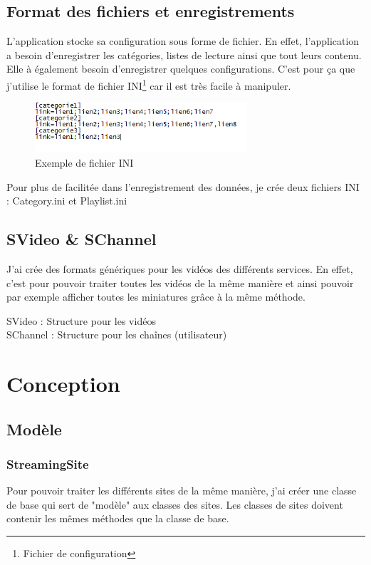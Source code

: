 \documentclass[11pt]{report} %
\begin{document}
		\subsection{Format des fichiers et enregistrements}
		L'application stocke sa configuration sous forme de fichier. En effet, l'application a besoin d'enregistrer les catégories, listes de lecture ainsi que tout leurs contenu. Elle à également besoin d'enregistrer quelques configurations. C'est pour ça que j'utilise le format de fichier INI\footnote{Fichier de configuration} car il est très facile à manipuler. 
		
		\begin{figure}[h]
			\center
			\includegraphics[width=0.7\textwidth]{../img/inifile.png}
			\caption{Exemple de fichier INI}
			\label{inifile}
		\end{figure}
		
		Pour plus de facilitée dans l'enregistrement des données, je crée deux fichiers INI : Category.ini et Playlist.ini
			
		\subsection{SVideo \& SChannel}
			J'ai crée des formats génériques pour les vidéos des différents services. En effet, c'est pour pouvoir traiter toutes les vidéos de la même manière et ainsi pouvoir par exemple afficher toutes les miniatures grâce à la même méthode.
			
			SVideo : Structure pour les vidéos\\
			SChannel : Structure pour les chaînes (utilisateur)
	
	\section{Conception}
		\subsection{Modèle}
			\subsubsection{StreamingSite}
			Pour pouvoir traiter les différents sites de la même manière, j'ai créer une classe de base qui sert de "modèle" aux classes des sites.
			Les classes de sites doivent contenir les mêmes méthodes que la classe de base.
			
\end{document}
